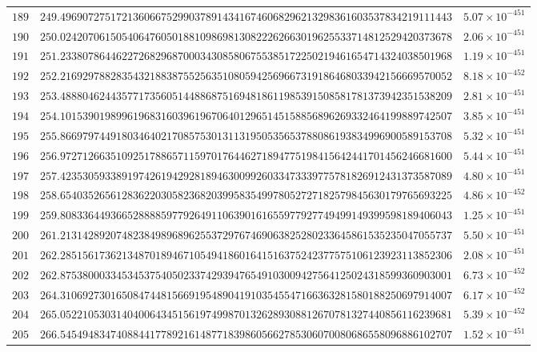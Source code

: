 \documentclass[12pt,reqno]{amsart}
\theoremstyle{remark}
\begin{document}
\begin{longtable}{clc}
$189$ & $249.4969072751721360667529903789143416746068296213298361603537834219111443$ & $5.07\times 10^{-451}$ \\
$190$ & $250.0242070615054064760501881098698130822262663019625533714812529420373678$ & $2.06\times 10^{-451}$ \\
$191$ & $251.2338078644622726829687000343085806755385172250219461654714324038501968$ & $1.19\times 10^{-451}$ \\
$192$ & $252.2169297882835432188387552563510805942569667319186468033942156669570052$ & $8.18\times 10^{-452}$ \\
$193$ & $253.4888046244357717356051448868751694818611985391508581781373942351538209$ & $2.81\times 10^{-451}$ \\
$194$ & $254.1015390198996196831603961967064012965145158856896269332464199889742507$ & $3.85\times 10^{-451}$ \\
$195$ & $255.8669797449180346402170857530131131950535653788086193834996900589153708$ & $5.32\times 10^{-451}$ \\
$196$ & $256.9727126635109251788657115970176446271894775198415642441701456246681600$ & $5.44\times 10^{-451}$ \\
$197$ & $257.4235305933891974261942928189463009926033473339775781826912431373587089$ & $4.80\times 10^{-451}$ \\
$198$ & $258.6540352656128362203058236820399583549978052727182579845630179765693225$ & $4.86\times 10^{-452}$ \\
$199$ & $259.8083364493665288885977926491106390161655977927749499149399598189406043$ & $1.25\times 10^{-451}$ \\
$200$ & $261.2131428920748238498968962553729767469063825280233645861535235047055737$ & $5.50\times 10^{-451}$ \\
$201$ & $262.2851561736213487018946710549418601641516375242377575106123923113852306$ & $2.08\times 10^{-451}$ \\
$202$ & $262.8753800033453453754050233742939476549103009427564125024318599360903001$ & $6.73\times 10^{-452}$ \\
$203$ & $264.3106927301650847448156691954890419103545547166363281580188250697914007$ & $6.17\times 10^{-452}$ \\
$204$ & $265.0522105303140400643451561974998701326289308812670781327440856116239681$ & $5.39\times 10^{-452}$ \\
$205$ & $266.5454948347408844177892161487718398605662785306070080686558096886102707$ & $1.52\times 10^{-451}$ \\

\end{longtable}
\end{document}
